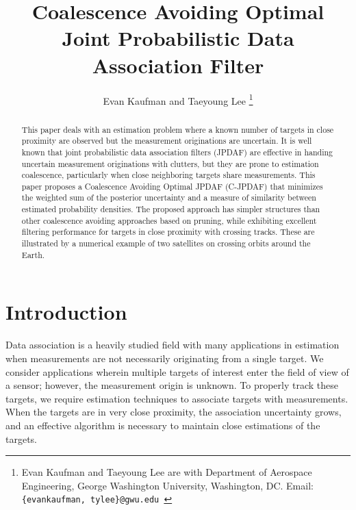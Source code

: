 \documentclass[letterpaper, 10pt, conference]{ieeeconf}
\title{\LARGE \bf
Coalescence Avoiding Optimal Joint Probabilistic Data Association Filter}
\author{Evan Kaufman and Taeyoung Lee
 \thanks{Evan Kaufman and Taeyoung Lee are with Department of Aerospace Engineering, George Washington University, Washington, DC. Email: {\tt\footnotesize \{evankaufman, tylee\}@gwu.edu }}
}
\begin{document}
\allowdisplaybreaks


\maketitle \thispagestyle{empty} \pagestyle{empty}

\begin{abstract}
This paper deals with an estimation problem where a known number of targets in close proximity are observed but the measurement originations are uncertain. It is well known that joint probabilistic data association filters (JPDAF) are effective in handing uncertain measurement originations with clutters, but they are prone to estimation coalescence, particularly when close neighboring targets share measurements. This paper proposes a Coalescence Avoiding Optimal JPDAF (C-JPDAF) that minimizes the weighted sum of the posterior uncertainty and a measure of similarity between estimated probability densities. The proposed approach has simpler structures than other coalescence avoiding approaches based on pruning, while exhibiting excellent filtering performance for targets in close proximity with crossing tracks. These are illustrated by a numerical example of two satellites on crossing orbits around the Earth.
\end{abstract}


\section{Introduction}

Data association is a heavily studied field with many applications in estimation when measurements are not necessarily originating from a single target.
We consider applications wherein multiple targets of interest enter the field of view of a sensor; however, the measurement origin is unknown.
To properly track these targets, we require estimation techniques to associate targets with measurements.
When the targets are in very close proximity, the association uncertainty grows, and an effective algorithm is necessary to maintain close estimations of the targets.
\end{document}
